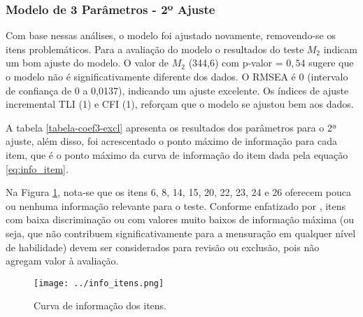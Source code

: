 \subsubsection{Modelo de 3 Parâmetros - 2º Ajuste}

 Com base nessas análises, o modelo foi ajustado novamente, removendo-se os itens problemáticos. Para a avaliação do modelo o resultados do teste $M_2$ indicam um bom ajuste do modelo. O valor de $M_2$ (344,6) com p-valor = $0,54$ sugere que o modelo não é significativamente diferente dos dados. O RMSEA é 0 (intervalo de confiança de 0 a 0,0137), indicando um ajuste excelente. Os índices de ajuste incremental TLI (1) e CFI (1), reforçam que o modelo se ajustou bem aos dados.
 
 
  A tabela \ref{tabela-coef3-excl} apresenta os resultados dos parâmetros para o 2ª ajuste, além disso, foi acrescentado o ponto máximo de informação para cada item, que é o ponto máximo da curva de informação do item  dada pela equação \ref{eq:info_item}.

Na Figura \ref{fig:info_itens}, nota-se que os itens 6, 8, 14, 15, 20, 22, 23, 24 e 26 oferecem pouca ou nenhuma informação relevante para o teste. Conforme enfatizado por , itens com baixa discriminação ou com valores muito baixos de informação máxima (ou seja, que não contribuem significativamente para a mensuração em qualquer nível de habilidade) devem ser considerados para revisão ou exclusão, pois não agregam valor à avaliação.



\begin{figure}[!ht]
	\centering
	\caption{Curva de informação dos itens.}
	\texttt{[image: ../info\_itens.png]}
	\parbox{\textwidth}{
		\centering %
	}
	\label{fig:info_itens}
\end{figure}

